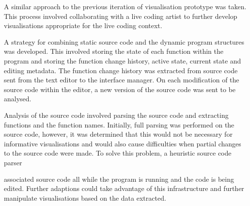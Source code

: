 A similar approach to the previous iteration of visualisation prototype was taken. This process involved collaborating with a live coding artist to further develop visualisations appropriate for the live coding context.

A strategy for combining static source code and the dynamic program structures was developed. This involved storing the state of each function within the program and storing the function change history, active state, current state and editing metadata. The function change history was extracted from source code sent from the text editor to the interface manager. On each modification of the source code within the editor, a new version of the source code was sent to be analysed.

Analysis of the source code involved parsing the source code and extracting functions and the function names. Initially, full parsing was performed on the source code, however, it was determined that this would not be necessary for informative visualisations and would also cause difficulties when partial changes to the source code were made. To solve this problem, a heuristic source code parser




 associated source code all while the program is running and the code is being edited. Further adaptions could take advantage of this infrastructure and further manipulate visualisations based on the data extracted.



